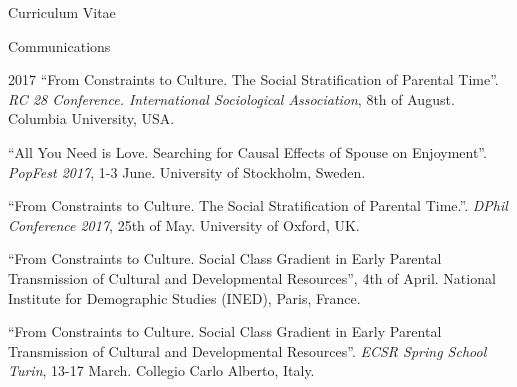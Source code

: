 \documentclass[12pt,a4paper]{article}
\begin{document}
\begin{cv}{Curriculum Vitae}
\begin{cvlist}{Communications}
	
		\item[2017] ``From Constraints to Culture. The Social Stratification of Parental Time''. \emph{RC 28 Conference. International Sociological Association}, 8th of August. Columbia University, USA. 
				
	\item[] ``All You Need is Love. Searching for Causal Effects of Spouse on Enjoyment''. \emph{PopFest 2017}, 1-3 June. University of Stockholm, Sweden. 
	
	\item[] ``From Constraints to Culture.
The Social Stratification of Parental Time.''. \emph{DPhil Conference 2017}, 25th of May. University of Oxford, UK. 
	
	\item[]  ``From Constraints to Culture. Social Class Gradient in Early Parental Transmission of Cultural and Developmental Resources'', 4th of April. National Institute for Demographic Studies (INED), Paris, France. 
	
	\item[]  ``From Constraints to Culture. Social Class Gradient in Early Parental Transmission of Cultural and Developmental Resources''. \emph{ECSR Spring School Turin}, 13-17 March. Collegio Carlo Alberto, Italy. 
	

\end{cvlist}
\end{cv}
\end{document}
